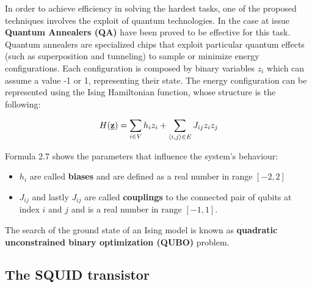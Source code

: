 In order to achieve efficiency in solving the hardest tasks, one of the proposed techniques involves the exploit of quantum technologies. In the case at issue \textbf{Quantum Annealers (QA)} have been proved to be effective for this task. \\
Quantum annealers are specialized chips that exploit particular quantum effects (such as superposition and tunneling) to sample or minimize energy configurations. Each configuration is composed by binary variables $z_i$ which can assume a value -1 or 1, representing their state. The energy configuration can be represented using the Ising Hamiltonian function, whose structure is the following:

\begin{equation}
    H(\textbf{\underline{z}}) = \sum_{i \in V} h_iz_i + \sum_{\langle i,j\rangle \in E} J_{ij} z_iz_j
\end{equation}

Formula 2.7 shows the parameters that influence the system's behaviour: 

\begin{itemize}
    \item $h_i$ are called \textbf{biases} and are defined as a real number in range $[-2,2]$
    \item $J_{ij}$ and lastly $J_{ij}$ are called \textbf{couplings} to the connected pair of qubits at index $i$ and $j$ and is a real number in range $[-1,1]$.
\end{itemize}

The search of the ground state of an Ising model is known as \textbf{quadratic unconstrained binary optimization (QUBO)} problem. \\

\subsection{The SQUID transistor}


